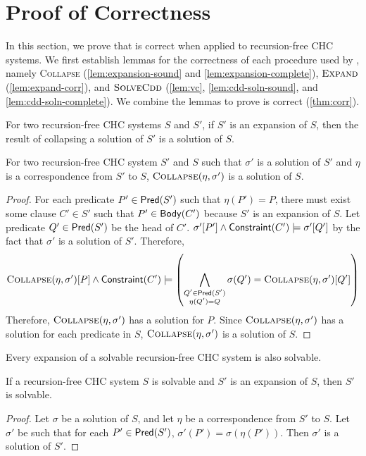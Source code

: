 \section{Proof of Correctness}
\label{app:corr}
%
In this section, we prove that \sys is correct when applied to
recursion-free CHC systems.
%
We first establish lemmas for the correctness of each procedure used
by \sys, namely \textsc{Collapse} (\autoref{lem:expansion-sound} and
\autoref{lem:expansion-complete}), $\textsc{Expand}$
(\autoref{lem:expand-corr}), and $\textsc{SolveCdd}$
(\autoref{lem:vc}, \autoref{lem:cdd-soln-sound}, and
\autoref{lem:cdd-soln-complete}).
%
We combine the lemmas to prove \sys is correct (\autoref{thm:corr}).

For two recursion-free CHC systems $S$ and $S'$, if $S'$ is
an expansion of $S$, then the result of collapsing a
solution of $S'$ is a solution of $S$.
%
\begin{lem}
  \label{lem:expansion-sound}
  For two recursion-free CHC system $S'$ and $S$ such that $\sigma'$
  is a solution of $S'$ and $\eta$ is a correspondence from
  $S'$ to $S$, $\textsc{Collapse}(\eta, \sigma')$ is a
  solution of $S$.
\end{lem}
%
\begin{proof}
  For each predicate $P' \in \mathsf{Pred}( S' )$ such that $\eta(P') = P$,
  there must exist some clause $C' \in S'$ such that $P' \in \mathsf{Body}(C')$
  because $S'$ is an expansion of $S$.
  Let predicate $Q' \in \mathsf{Pred}( S' )$ be the head of $C'$.
  $\sigma'[P'] \land \mathsf{Constraint}(C') \models \sigma'[Q']$ by
  the fact that $\sigma'$ is a solution of $S'$.
  Therefore,
  \[ \collapse{ \eta }{ \sigma' }[P] \land \consof{C'} \entails %
  \left( \bigland_{ \substack{Q' \in \predof{S'} \\ \eta(Q') = Q} }
  \sigma(Q') = %
  \collapse{\eta}{\sigma'}[Q'] \right)
  \]
  Therefore, $\textsc{Collapse}(\eta, \sigma')$ has a solution for $P$.
  Since $\textsc{Collapse}(\eta, \sigma')$ has a solution for each predicate
  in $S$, $\textsc{Collapse}(\eta, \sigma')$ is a solution of $S$.
\end{proof}

Every expansion of a solvable recursion-free CHC system is also
solvable.
\begin{lem}
  \label{lem:expansion-complete}
  If a recursion-free CHC system $S$ is solvable and
  $S'$ is an expansion of $S$, then $S'$ is solvable.
\end{lem}
%
\begin{proof}
  Let $\sigma$ be a solution of $S$, and let $\eta$ be a
  correspondence from $S'$ to $S$.
  Let $\sigma'$ be such that for each $P' \in \mathsf{Pred}( S' )$,
  $\sigma'(P') = \sigma(\eta(P'))$.
  Then $\sigma'$ is a solution of $S'$.
\end{proof}

